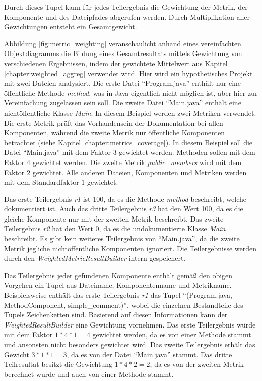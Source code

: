 
Durch dieses Tupel kann für jedes Teilergebnis die Gewichtung der Metrik, der Komponente und des Dateipfades  abgerufen werden. Durch Multiplikation  aller Gewichtungen entsteht ein Gesamtgewicht.

Abbildung \ref{fig:metric_weighting} veranschaulicht anhand eines vereinfachten Objektdiagramms die Bildung eines Gesamtresultats mittels Gewichtung von verschiedenen Ergebnissen, indem der gewichtete Mittelwert aus Kapitel \ref{chapter:weighted_aggreg} verwendet wird. Hier wird ein hypothetisches Projekt mit zwei Dateien analysiert. Die erste Datei \enquote{Program.java} enthält nur eine öffentliche Methode \textit{method}, was in Java eigentlich nicht möglich ist, aber hier zur Vereinfachung zugelassen sein soll. Die zweite Datei \enquote{Main.java} enthält eine nichtöffentliche Klasse \textit{Main}. In diesem Beispiel werden zwei Metriken verwendet. Die erste Metrik prüft das Vorhandensein der Dokumentation bei allen Komponenten, während die zweite Metrik nur öffentliche Komponenten betrachtet (siehe Kapitel \ref{chapter:metrics_coverage}). In diesem Beispiel soll die Datei \enquote{Main.java} mit dem Faktor $3$ gewichtet werden. Methoden sollen mit dem Faktor $4$ gewichtet werden. Die zweite Metrik \textit{public\_members} wird mit dem Faktor $2$ gewichtet. Alle anderen Dateien, Komponenten und Metriken werden mit dem Standardfaktor $1$ gewichtet.

Das erste Teilergebnis \textit{r1} ist 100, da es die  Methode \textit{method} beschreibt, welche dokumentiert ist. Auch das dritte Teilergebnis \textit{r3} hat den Wert 100, da es die gleiche Komponente nur mit der zweiten Metrik beschreibt. Das zweite Teilergebnis \textit{r2} hat den Wert 0, da es die undokumentierte Klasse \textit{Main} beschreibt.  Es gibt kein weiteres Teilergebnis von \enquote{Main.java}, da die zweite Metrik jegliche nichtöffentliche Komponenten ignoriert. Die Teilergebnisse werden durch den \textit{WeightedMetricResultBuilder} intern gespeichert. 

Das Teilergebnis jeder gefundenen Komponente enthält gemäß den obigen Vorgehen ein Tupel aus Dateiname, Komponentenname und Metrikname. Beispielsweise enthält das erste  Teilergebnis \textit{r1} das Tupel \enquote{(Program.java, MethodComponent, simple\_comment)}, wobei die einzelnen Bestandteile des Tupels Zeichenketten sind. Basierend auf diesen Informationen kann der \textit{WeightedResultBuilder} eine Gewichtung vornehmen. Das erste Teilergebnis würde mit dem Faktor $1*4*1=4$ gewichtet werden, da es von einer Methode stammt  und ansonsten nicht besonders gewichtet wird. Das zweite Teilergebnis erhält das Gewicht $3*1*1=3$, da es von der Datei \enquote{Main.java} stammt. Das dritte Teilresultat besitzt die Gewichtung $1*4*2=2$, da es von der zweiten Metrik berechnet wurde und auch von einer Methode stammt. 

